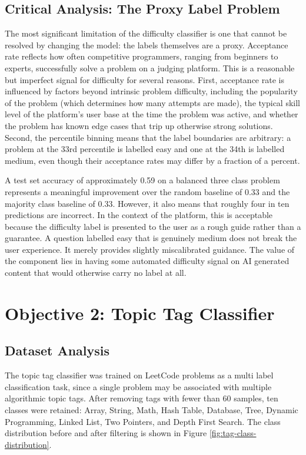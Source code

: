 \subsection{Critical Analysis: The Proxy Label Problem}

The most significant limitation of the difficulty classifier is one
that cannot be resolved by changing the model: the labels themselves
are a proxy. Acceptance rate reflects how often competitive programmers,
ranging from beginners to experts, successfully solve a problem on a
judging platform. This is a reasonable but imperfect signal for
difficulty for several reasons. First, acceptance rate is influenced
by factors beyond intrinsic problem difficulty, including the
popularity of the problem (which determines how many attempts are
made), the typical skill level of the platform's user base at the time
the problem was active, and whether the problem has known edge cases
that trip up otherwise strong solutions. Second, the percentile
binning means that the label boundaries are arbitrary: a problem at
the 33rd percentile is labelled easy and one at the 34th is labelled
medium, even though their acceptance rates may differ by a fraction of
a percent.

A test set accuracy of approximately 0.59 on a balanced three class
problem represents a meaningful improvement over the random baseline
of 0.33 and the majority class baseline of 0.33. However, it also
means that roughly four in ten predictions are incorrect. In the
context of the platform, this is acceptable because the difficulty
label is presented to the user as a rough guide rather than a
guarantee. A question labelled easy that is genuinely medium does not
break the user experience. It merely provides slightly miscalibrated
guidance. The value of the component lies in having some automated
difficulty signal on AI generated content that would otherwise carry
no label at all.

\section{Objective 2: Topic Tag Classifier}
\label{sec:eval-tags}

\subsection{Dataset Analysis}

The topic tag classifier was trained on LeetCode \cite{kaggleleetcode2025}
problems as a multi label classification task, since a single problem
may be associated with multiple algorithmic topic tags. After removing
tags with fewer than 60 samples, ten classes were retained: Array,
String, Math, Hash Table, Database, Tree, Dynamic Programming, Linked
List, Two Pointers, and Depth First Search. The class distribution
before and after filtering is shown in Figure
\ref{fig:tag-class-distribution}.

